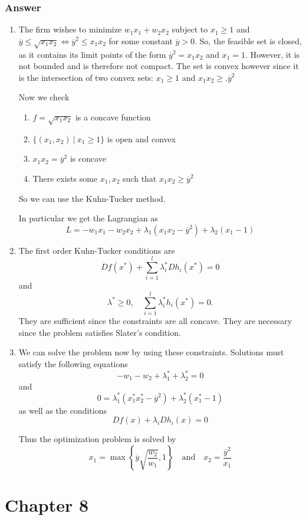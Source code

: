 \documentclass[12pt]{article}
\begin{document}
\subsubsection{Answer}
\begin{enumerate}
\item The firm wishes to minimize $w_1 x_1 + w_2 x_2$ subject to $x_1 \geq 1$ and $\overline{y}  \leq \sqrt{x_1 x_2} \Leftrightarrow \overline{y}^2 \leq  x_1 x_2$ for some constant $\overline{y} > 0$. So, the feasible set is closed, as it contains its limit points of the form $\overline{y}^2 = x_1 x_2 $ and $x_1 =1$. However, it is not bounded and is therefore not compact. The set is convex however since it is the intersection of two convex sets: $x_1\geq 1$ and $x_1 x_2 \geq.\overline{y}^2$

Now we check
\begin{enumerate}
\item $f=\sqrt{x_1 x_2}$ is a concave function 
\item $\{(x_1,x_2)\ |\ x_1\geq 1\}$ is open and convex 
\item  $x_1 x_2 = \overline{y}^2$ is concave
\item There exists some $x_1, x_2$ such that $x_1 x_2 \geq \overline{y}^2$
\end{enumerate}
So we can use the Kuhn-Tucker method.

In particular we get the Lagrangian as 
\[L=-w_1 x_1 -w_2 x_2 + \lambda_1(x_1 x_2 - \overline{y}^2 ) +\lambda_2(x_1 -1) \]
 
\item The first order Kuhn-Tucker conditions are
\[Df(x^*) + \sum_{i=1}^l \lambda_i^* Dh_i (x^*) = 0\]
and
\[ \lambda^* \geq 0, \quad \sum_{i=1}^l \lambda_i^* h_i(x^*) = 0.\]
They are sufficient since the constraints are all concave. They are necessary since the problem satisfies Slater's condition.
\item We can solve the problem now by using these constraints. Solutions must satisfy the following equations
\[-w_1-w_2+\lambda_1^*+\lambda_2^*=0\]
and
\[0=\lambda^*_1 (x_1^* x_2^*-\overline{y}^2)+ \lambda^*_2(x_1^* -1)\]
as well as the conditions
\[ Df(x)+ \lambda_i Dh_i(x) = 0 \]

Thus the optimization problem is solved by 
\[x_1 = \max{\left\{\overline{y} \sqrt{\frac{w_2}{w_1}},1\right\}}  \quad \mathrm{and}\quad x_2=\frac{\overline{y}^2 }{x_1}\]
\end{enumerate}


\section{Chapter 8}
\end{document}
